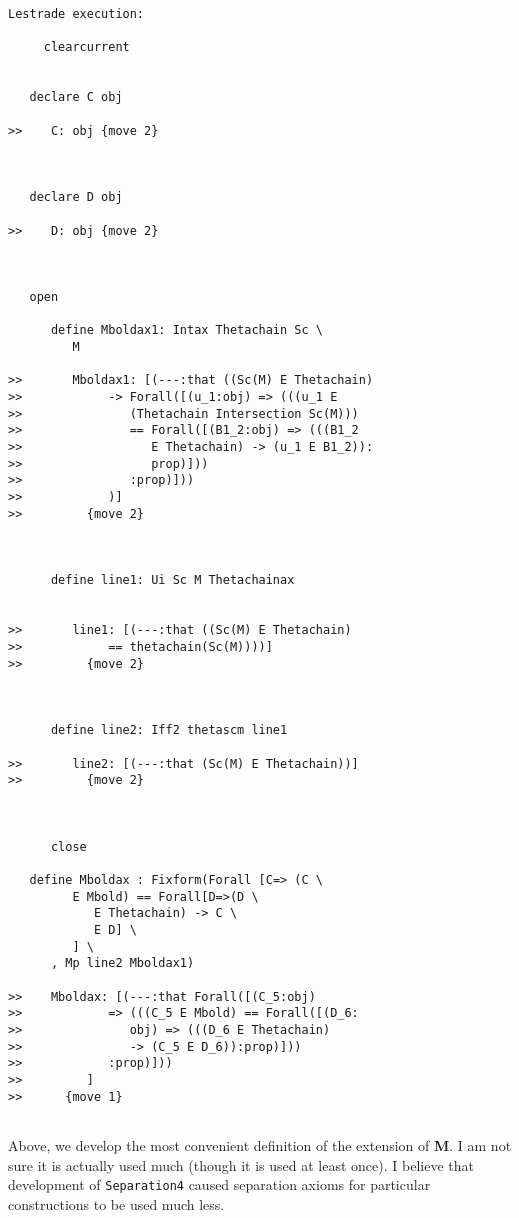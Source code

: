 \documentclass[12pt]{article}
\begin{document}
\begin{verbatim}Lestrade execution:

     clearcurrent


   declare C obj

>>    C: obj {move 2}



   declare D obj

>>    D: obj {move 2}



   open

      define Mboldax1: Intax Thetachain Sc \
         M

>>       Mboldax1: [(---:that ((Sc(M) E Thetachain)
>>            -> Forall([(u_1:obj) => (((u_1 E
>>               (Thetachain Intersection Sc(M)))
>>               == Forall([(B1_2:obj) => (((B1_2
>>                  E Thetachain) -> (u_1 E B1_2)):
>>                  prop)]))
>>               :prop)]))
>>            )]
>>         {move 2}



      define line1: Ui Sc M Thetachainax


>>       line1: [(---:that ((Sc(M) E Thetachain)
>>            == thetachain(Sc(M))))]
>>         {move 2}



      define line2: Iff2 thetascm line1

>>       line2: [(---:that (Sc(M) E Thetachain))]
>>         {move 2}



      close

   define Mboldax : Fixform(Forall [C=> (C \
         E Mbold) == Forall[D=>(D \
            E Thetachain) -> C \
            E D] \
         ] \
      , Mp line2 Mboldax1)

>>    Mboldax: [(---:that Forall([(C_5:obj)
>>            => (((C_5 E Mbold) == Forall([(D_6:
>>               obj) => (((D_6 E Thetachain)
>>               -> (C_5 E D_6)):prop)]))
>>            :prop)]))
>>         ]
>>      {move 1}


\end{verbatim}

Above, we develop the most convenient definition of the extension of {\bf M}.  I am not sure it is actually used much (though it is used at least once).  I believe that
development of {\tt Separation4} caused separation axioms for particular constructions to be used much less.
\end{document}
